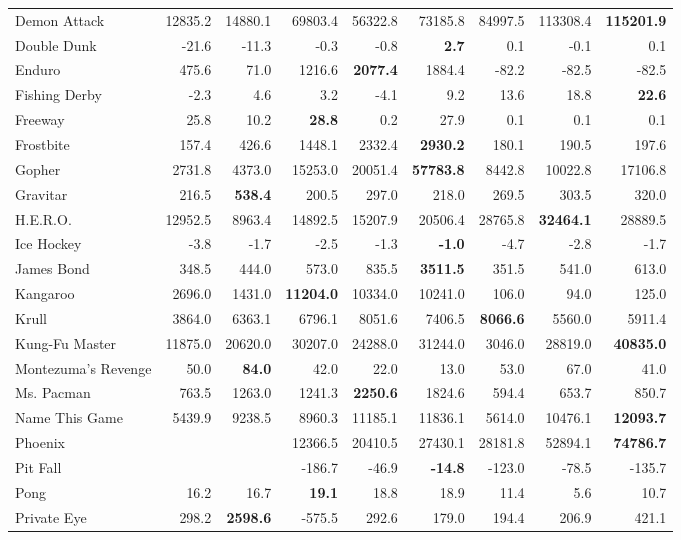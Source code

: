 \documentclass{article} %
\begin{document}
\begin{table}[h]
\begin{scriptsize}
\begin{tabular}{lrrrrrrrr}
Demon Attack & 12835.2 & 14880.1 & 69803.4 & 56322.8 & 73185.8 & 84997.5 & 113308.4 & \textbf{115201.9}\\
Double Dunk & -21.6 & -11.3 & -0.3 & -0.8 & \textbf{2.7} & 0.1 & -0.1 & 0.1\\
Enduro & 475.6 & 71.0 & 1216.6 & \textbf{2077.4} & 1884.4 & -82.2 & -82.5 & -82.5\\
Fishing Derby & -2.3 & 4.6 & 3.2 & -4.1 & 9.2 & 13.6 & 18.8 & \textbf{22.6}\\
Freeway & 25.8 & 10.2 & \textbf{28.8} & 0.2 & 27.9 & 0.1 & 0.1 & 0.1\\
Frostbite & 157.4 & 426.6 & 1448.1 & 2332.4 & \textbf{2930.2} & 180.1 & 190.5 & 197.6\\
Gopher & 2731.8 & 4373.0 & 15253.0 & 20051.4 & \textbf{57783.8} & 8442.8 & 10022.8 & 17106.8\\
Gravitar & 216.5 & \textbf{538.4} & 200.5 & 297.0 & 218.0 & 269.5 & 303.5 & 320.0\\
H.E.R.O. & 12952.5 & 8963.4 & 14892.5 & 15207.9 & 20506.4 & 28765.8 & \textbf{32464.1} & 28889.5\\
Ice Hockey & -3.8 & -1.7 & -2.5 & -1.3 & \textbf{-1.0} & -4.7 & -2.8 & -1.7\\
James Bond & 348.5 & 444.0 & 573.0 & 835.5 & \textbf{3511.5} & 351.5 & 541.0 & 613.0\\
Kangaroo & 2696.0 & 1431.0 & \textbf{11204.0} & 10334.0 & 10241.0 & 106.0 & 94.0 & 125.0\\
Krull & 3864.0 & 6363.1 & 6796.1 & 8051.6 & 7406.5 & \textbf{8066.6} & 5560.0 & 5911.4\\
Kung-Fu Master & 11875.0 & 20620.0 & 30207.0 & 24288.0 & 31244.0 & 3046.0 & 28819.0 & \textbf{40835.0}\\
Montezuma's Revenge & 50.0 & \textbf{84.0} & 42.0 & 22.0 & 13.0 & 53.0 & 67.0 & 41.0\\
Ms. Pacman & 763.5 & 1263.0 & 1241.3 & \textbf{2250.6} & 1824.6 & 594.4 & 653.7 & 850.7\\
Name This Game & 5439.9 & 9238.5 & 8960.3 & 11185.1 & 11836.1 & 5614.0 & 10476.1 & \textbf{12093.7}\\
Phoenix &  &  & 12366.5 & 20410.5 & 27430.1 & 28181.8 & 52894.1 & \textbf{74786.7}\\
Pit Fall &  &  & -186.7 & -46.9 & \textbf{-14.8} & -123.0 & -78.5 & -135.7\\
Pong & 16.2 & 16.7 & \textbf{19.1} & 18.8 & 18.9 & 11.4 & 5.6 & 10.7\\
Private Eye & 298.2 & \textbf{2598.6} & -575.5 & 292.6 & 179.0 & 194.4 & 206.9 & 421.1\\

\end{tabular}
\end{scriptsize}
\end{table}
\end{document}
